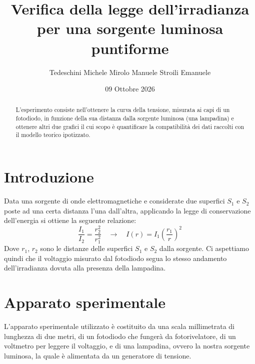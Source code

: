 \documentclass[10pt,twocolumn]{article}
\begin{document}
\justifying
	\title{\textbf{Verifica della legge dell'irradianza per una sorgente luminosa puntiforme}}
	\author{Tedeschini Michele \hspace{0.7cm} Mirolo Manuele \hspace{0.7cm} Stroili Emanuele}
	\date{09 Ottobre 2026}
	\maketitle
	\onecolumn
	\tableofcontents
\vspace{3cm}
	\begin{abstract}
		\centering
		\large
    L'esperimento consiste nell'ottenere la curva della tensione, misurata ai capi di un fotodiodo, in funzione della sua distanza dalla sorgente luminosa (una lampadina) 
   e ottenere altri due grafici il cui scopo è quantificare la compatibilità dei dati raccolti con il modello teorico ipotizzato. 
	\end{abstract}

	\newpage
\restoregeometry
\twocolumn


\section{Introduzione }
Data una sorgente di onde elettromagnetiche e considerate due superfici 
$S_1$ e $S_2$ poste ad una certa distanza l'una dall'altra, applicando la legge di conservazione dell'energia si ottiene la seguente relazione:
\begin{equation}
    \frac{I_1}{I_2} = \frac{r_2^2}{r_1^2} \quad \longrightarrow \quad I(r) = I_1 \left(\frac{r_1}{r}\right)^2
\end{equation}
Dove $r_{1}$, $r_2$ sono le distanze delle superfici $S_{1}$ e $S_{2}$ dalla sorgente.
Ci aspettiamo quindi che il voltaggio misurato dal fotodiodo segua lo stesso andamento dell'irradianza dovuta alla presenza della lampadina.

\section{Apparato sperimentale}
L'apparato sperimentale utilizzato è costituito da una scala millimetrata di 
lunghezza di due metri,
di un fotodiodo che fungerà da fotorivelatore, di un voltmetro 
per leggere il voltaggio, e di una lampadina, ovvero
la nostra sorgente luminosa, la quale è alimentata da un generatore di tensione.
\end{document}
